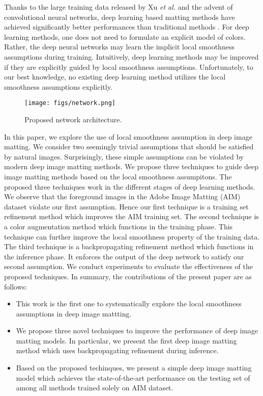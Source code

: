 \documentclass{article}
\theoremstyle{plain}
\begin{document}
Thanks to the large training data released by Xu \emph{et al.} \cite{Xu2017DeepImageMatting}
and the advent of convolutional neural networks,
deep learning based matting methods have
achieved significantly better performances than traditional methods \cite{Xu2017DeepImageMatting,Li2020NaturalImageMatting,Tang2019Learning-Based,Forte2020FBA,Yu2021High-ResolutionDeepImageMatting,Sun2021SemanticImageMatting}.
For deep learning methods,
one does not need to formulate an explicit model of colors.
Rather, the deep neural networks may learn the implicit local smoothness assumptions during training.
Intuitively, deep learning methods may be improved if they are explicitly guided by local smoothness assumptions.
Unfortunately, to our best knowledge, no existing deep learning method utilizes the local smoothness assumptions explicitly.




\begin{figure*}[t]
  \centering
  \texttt{[image: figs/network.png]}
  \caption{Proposed network architecture.}
  \label{fig:1}
\end{figure*}
In this paper, we explore the use of local smoothness assumption 
in deep image matting.
We consider two seemingly trivial assumptions that should be satisfied by natural images.
Surprisingly, these simple assumptions can be violated by modern deep image matting methods.
We propose three techniques to guide deep image matting methods based on the local smoothness assumpitons.
The proposed three techniques work in the different stages of deep learning methods.
We observe that the foreground images in the Adobe Image Matting (AIM) dataset \cite{Xu2017DeepImageMatting} violate our first assumption.
Hence our first technique is a training set refinement method which improves the AIM training set.
The second technique is a color augmentation method which functions in the training phase.
This technique can further improve the local smoothness property of the training data.
The third technique is a backpropagating refinement method which functions in the inference phase.
It enforces the output of the deep network to satisfy our second assumption.
We conduct experiments to evaluate the effectiveness of the proposed techniques.
In summary, the contributions of the present paper are as follows:
\begin{itemize}
    \item
        This work is the first one to systematically explore the local smoothness assumptions in deep image mattting.
    \item
        We propose three novel techniques to improve the performance of deep image matting models.
        In particular, we present the first deep image matting method which uses backpropagating refinement during inference.
    \item
        Based on the proposed techinques,
        we present a simple deep image matting model which achieves the state-of-the-art performance on the testing set of \cite{Xu2017DeepImageMatting} among all methods trained solely on AIM dataset.
\end{itemize}
\end{document}
